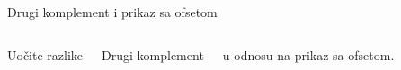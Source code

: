 \begin{frame}[label=04-s037]{Drugi komplement i prikaz sa ofsetom}
\begin{columns}[c,onlytextwidth]
\centering
{\fontsize{16}{20}\selectfont Uočite razlike\par}
\par\vspace{5mm}
Drugi komplement\par u odnosu na prikaz sa ofsetom.
\centering
{\fontsize{9}{10}\selectfont\renewcommand{\arraystretch}{.82}\par}
\end{columns}
\end{frame}
